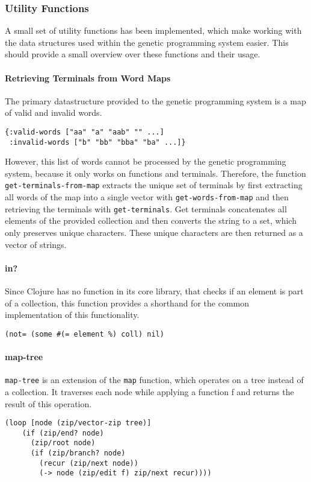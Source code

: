 \documentclass[runningheads]{llncs}
\begin{document}
\subsubsection{Utility Functions}
A small set of utility functions has been implemented, which make working with the data structures used within the genetic programming system easier. This should provide a small overview over these functions and their usage.

\paragraph{Retrieving Terminals from Word Maps}
The primary datastructure provided to the genetic programming system is a map of valid and invalid words.
\begin{verbatim}
{:valid-words ["aa" "a" "aab" "" ...]
 :invalid-words ["b" "bb" "bba" "ba" ...]}
\end{verbatim}
However, this list of words cannot be processed by the genetic programming system, because it only works on functions and terminals. Therefore, the function \texttt{get-terminals-from-map} extracts the unique set of terminals by first extracting all words of the map into a single vector with \texttt{get-words-from-map} and then retrieving the terminals with \texttt{get-terminals}. Get terminals concatenates all elements of the provided collection and then converts the string to a set, which only preserves unique characters. These unique characters are then returned as a vector of strings.

\paragraph{in?}
Since Clojure has no function in its core library, that checks if an element is part of a collection, this function provides a shorthand for the common implementation of this functionality.
\begin{lstlisting}
(not= (some #(= element %) coll) nil)
\end{lstlisting}

\paragraph{map-tree}
\texttt{map-tree} is an extension of the \texttt{map} function, which operates on a tree instead of a collection. It traverses each node while applying a function f and returns the result of this operation.
\begin{lstlisting}
(loop [node (zip/vector-zip tree)]
    (if (zip/end? node)
      (zip/root node)
      (if (zip/branch? node)
        (recur (zip/next node))
        (-> node (zip/edit f) zip/next recur))))
\end{lstlisting}
\end{document}
